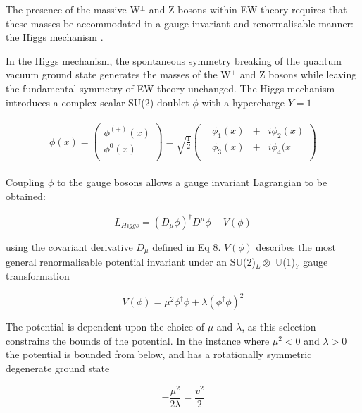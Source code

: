 \documentclass[12pt,a4paper,epsf,portrait,times,epsfig]{report}
\begin{document}
		The presence of the massive W$^{\pm}$ and Z bosons within EW theory requires that these masses be accommodated in a gauge invariant and renormalisable manner: the Higgs mechanism \cite{Brout-Englert}\cite{Higgs}. \par
		In the Higgs mechanism, the spontaneous symmetry breaking of the quantum vacuum ground state generates the masses of the W$^\pm$ and Z bosons while leaving the fundamental symmetry of EW theory unchanged. The Higgs mechanism introduces a complex scalar SU(2) doublet $\phi$ with a hypercharge $Y = 1$
		
		\begin{align}
		\begin{split}
			\phi(x) = \begin{pmatrix}
				\phi^{(+)}(x) \\
				\phi^{0}(x) \\
			\end{pmatrix} = \sqrt{\frac{1}{2}}\begin{pmatrix}
				&\phi_{1}(x) &+ &i\phi_{2}(x) \\
				&\phi_{3}(x) &+ &i\phi_{4}(x \\
			\end{pmatrix}
		\end{split}
		\end{align}
		
		Coupling $\phi$ to the gauge bosons allows a gauge invariant Lagrangian to be obtained:
		
		\begin{equation}
			L_{Higgs} = (D_{\mu}\phi)^{\dagger}D^{\mu}\phi-V(\phi)
		\end{equation}
		
		using the covariant derivative $D_{\mu}$ defined in Eq 8. $V(\phi)$ describes the most general renormalisable potential invariant under an SU(2)$_{L} \otimes$ U(1)$_{Y}$ gauge transformation
		
		\begin{equation}
			V(\phi) = \mu^{2}\phi^{\dagger}\phi + \lambda(\phi^{\dagger}\phi)^{2}
		\end{equation}
		
		The potential is dependent upon the choice of $\mu$ and $\lambda$, as this selection constrains the bounds of the potential. In the instance where $\mu^{2} < 0$ and $\lambda> 0$ the potential is bounded from below, and has a rotationally symmetric degenerate ground state
		
		\begin{equation}
		-\frac{\mu^{2}}{2\lambda} = \frac{v^2}{2}
		\end{equation}
		
\end{document}
